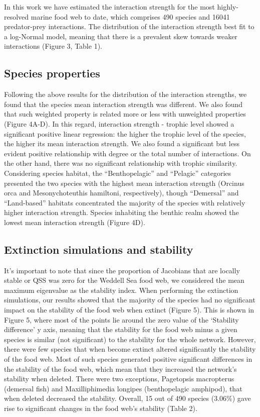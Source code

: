 \documentclass[gc, manuscript]{copernicus}
\begin{document}
In this work we have estimated the interaction strength for the most
highly-resolved marine food web to date, which comprises 490 species and
16041 predator-prey interactions. The distribution of the interaction
strength best fit to a log-Normal model, meaning that there is a
prevalent skew towards weaker interactions (Figure 3, Table 1).

\subsection{Species properties}

Following the above results for the distribution of the interaction
strengths, we found that the species mean interaction strength was
different. We also found that such weighted property is related more or
less with unweighted properties (Figure 4A-D). In this regard,
interaction strength - trophic level showed a significant positive
linear regression: the higher the trophic level of the species, the
higher its mean interaction strength. We also found a significant but
less evident positive relationship with degree or the total number of
interactions. On the other hand, there was no significant relationship
with trophic similarity. Considering species habitat, the
``Benthopelagic'' and ``Pelagic'' categories presented the two species
with the highest mean interaction strength (Orcinus orca and
Mesonychoteuthis hamiltoni, respectively), though ``Demersal'' and
``Land-based'' habitats concentrated the majority of the species with
relatively higher interaction strength. Species inhabiting the benthic
realm showed the lowest mean interaction strength (Figure 4D).

\subsection{Extinction simulations and stability}

It's important to note that since the proportion of Jacobians that are
locally stable or QSS was zero for the Weddell Sea food web, we
considered the mean maximum eigenvalue as the stability index. When
performing the extinction simulations, our results showed that the
majority of the species had no significant impact on the stability of
the food web when extinct (Figure 5). This is shown in Figure 5, where
most of the points lie around the zero value of the `Stability
difference' y axis, meaning that the stability for the food web minus a
given species is similar (not significant) to the stability for the
whole network. However, there were few species that when become extinct
altered significantly the stability of the food web. Most of such
species generated positive significant differences in the stability of
the food web, which mean that they increased the network's stability
when deleted. There were two exceptions, Pagetopsis macropterus
(demersal fish) and Maxilliphimedia longipes (benthopelagic amphipod),
that when deleted decreased the stability. Overall, 15 out of 490
species (3.06\%) gave rise to significant changes in the food web's
stability (Table 2).
\end{document}
